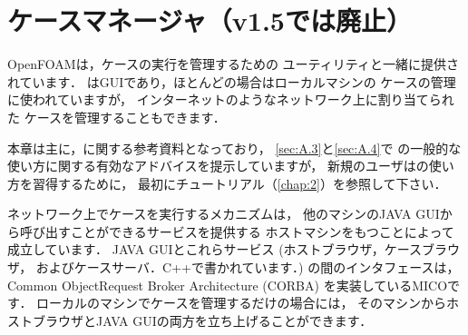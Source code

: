 \chapter{ケースマネージャ（v1.5では廃止）}
\label{chap:A}
%
%
OpenFOAMは，ケースの実行を管理するための
ユーティリティと一緒に提供されています．
はGUIであり，ほとんどの場合はローカルマシンの
ケースの管理に使われていますが，
インターネットのようなネットワーク上に割り当てられた
ケースを管理することもできます．

本章は主に，に関する参考資料となっており，
\autoref{sec:A.3}と\autoref{sec:A.4}で
の一般的な使い方に関する有効なアドバイスを提示していますが，
新規のユーザはの使い方を習得するために，
最初にチュートリアル（\autoref{chap:2}）を参照して下さい．

ネットワーク上でケースを実行するメカニズムは，
他のマシンのJAVA GUIから呼び出すことができるサービスを提供する
ホストマシンをもつことによって成立しています．
JAVA GUIとこれらサービス (ホストブラウザ，ケースブラウザ，
およびケースサーバ．C++で書かれています．) の間のインタフェースは，
%
Common ObjectRequest Broker Architecture (CORBA) を実装しているMICOです．
ローカルのマシンでケースを管理するだけの場合には，
そのマシンからホストブラウザとJAVA GUIの両方を立ち上げることができます．

